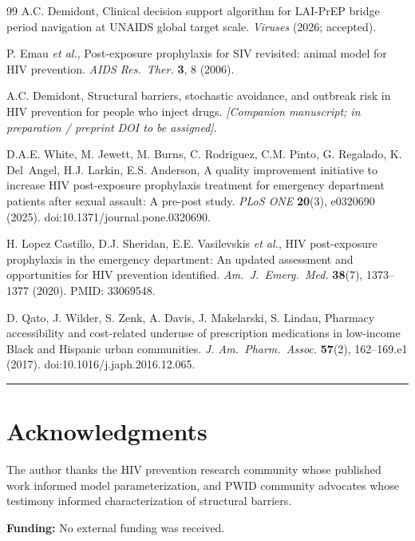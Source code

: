 \documentclass[10pt,letterpaper]{article}
\theoremstyle{definition}
\theoremstyle{remark}
\begin{document}
\begin{thebibliography}{99}
A.C. Demidont, Clinical decision support algorithm for LAI-PrEP bridge period navigation at UNAIDS global target scale. \textit{Viruses} (2026; accepted).

P. Emau \textit{et al.}, Post-exposure prophylaxis for SIV revisited: animal model for HIV prevention. \textit{AIDS Res.\ Ther.} \textbf{3}, 8 (2006).

A.C. Demidont, Structural barriers, stochastic avoidance, and outbreak risk in HIV prevention for people who inject drugs. \textit{[Companion manuscript; in preparation / preprint DOI to be assigned]}.

D.A.E. White, M. Jewett, M. Burns, C. Rodriguez, C.M. Pinto, G. Regalado, K. Del~Angel, H.J. Larkin, E.S. Anderson, A quality improvement initiative to increase HIV post-exposure prophylaxis treatment for emergency department patients after sexual assault: A pre-post study. \textit{PLoS ONE} \textbf{20}(3), e0320690 (2025). doi:10.1371/journal.pone.0320690.

H. Lopez Castillo, D.J. Sheridan, E.E. Vasilevskis \textit{et al.}, HIV post-exposure prophylaxis in the emergency department: An updated assessment and opportunities for HIV prevention identified. \textit{Am.\ J.\ Emerg.\ Med.} \textbf{38}(7), 1373--1377 (2020). PMID: 33069548.

D. Qato, J. Wilder, S. Zenk, A. Davis, J. Makelarski, S. Lindau, Pharmacy accessibility and cost-related underuse of prescription medications in low-income Black and Hispanic urban communities. \textit{J. Am.\ Pharm.\ Assoc.} \textbf{57}(2), 162--169.e1 (2017). doi:10.1016/j.japh.2016.12.065.

\end{thebibliography}

\vspace{1em}
\hrule
\vspace{0.5em}

\section*{Acknowledgments}
The author thanks the HIV prevention research community whose published work informed model parameterization, and PWID community advocates whose testimony informed characterization of structural barriers.

\textbf{Funding:} No external funding was received.
\end{document}
